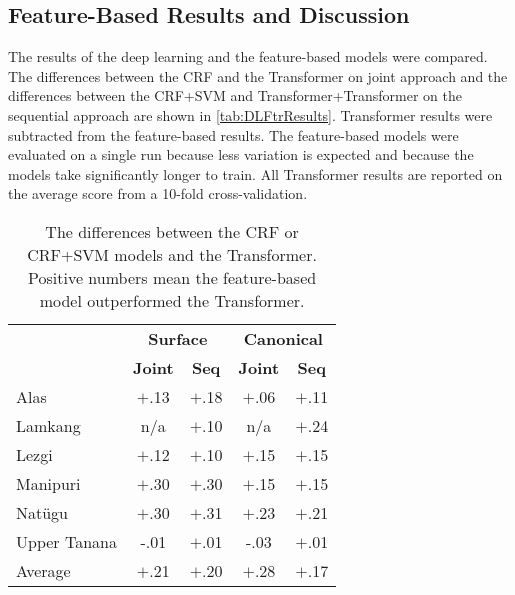 \subsection{Feature-Based Results and Discussion}
\label{sec:sgFtrAnalysis}

The results of the deep learning and the feature-based models were compared. The differences between the CRF and the Transformer on joint approach and the differences between the CRF+SVM and Transformer+Transformer on the sequential approach are shown in \autoref{tab:DLFtrResults}. Transformer results were subtracted from the feature-based results. The feature-based models were evaluated on a single run because less variation is expected and because the models take significantly longer to train. All Transformer results are reported on the average score from a 10-fold cross-validation. 

\begin{table}[!tb]
    \centering
    \begin{tabular}{l|cc|cc}
        & \multicolumn{2}{c|}{\textbf{Surface}} & \multicolumn{2}{c}{\textbf{Canonical}} \\
        & \textbf{Joint} & \textbf{Seq} & \textbf{Joint} & \textbf{Seq} \\
        \hline
        Alas & $+$.13 & $+$.18 & $+$.06 & $+$.11 \\
        \hline
        Lamkang & n/a & $+$.10 & n/a & $+$.24 \\
        \hline
        Lezgi & $+$.12 & $+$.10 & $+$.15 & $+$.15 \\
        \hline
        Manipuri & $+$.30 & $+$.30 & $+$.15 & $+$.15 \\
        \hline
        Nat\"ugu & $+$.30 & $+$.31 & $+$.23 & $+$.21 \\
        \hline
        Upper Tanana & -.01 & $+$.01 & -.03 & $+$.01 \\
        \hline
        \hline
        Average & $+$.21 & $+$.20 & $+$.28 & $+$.17 \\
    \end{tabular}
    \caption[F$_1$-score Differences of Feature-based Models minus Deep Learning]{The differences between the CRF or CRF+SVM models and the Transformer. Positive numbers mean the feature-based model outperformed the Transformer.}
    \label{tab:DLFtrResults}
\end{table}

